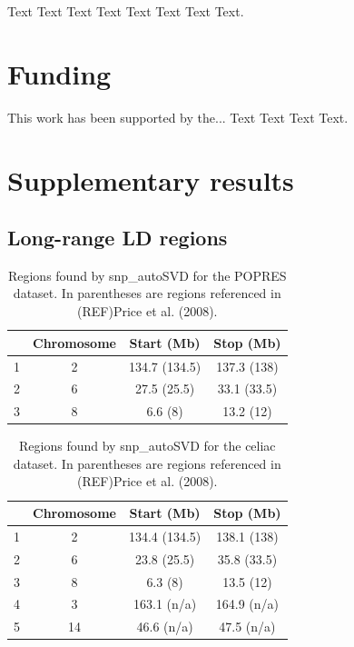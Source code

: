 \documentclass{bioinfo}
\begin{document}
Text Text Text Text Text Text  Text Text. 

\section*{Funding}

This work has been supported by the... Text Text  Text Text.\vspace*{-12pt}




\newpage
\section*{Supplementary results}

\subsection{Long-range LD regions}


\begin{table}[ht]
\centering
\begin{tabular}{lccc}
  \hline
 & Chromosome & Start (Mb) & Stop (Mb) \\ 
  \hline
1 &  2 & 134.7 (134.5) & 137.3 (138) \\ 
  2 &  6 & 27.5 (25.5) & 33.1 (33.5) \\ 
  3 &  8 & 6.6 (8) & 13.2 (12) \\ 
   \hline
\end{tabular}
\caption{Regions found by snp\_autoSVD for the POPRES dataset. In parentheses are regions referenced in (REF)Price et al. (2008).} 
\label{tab:lrldr-popres}
\end{table}

\begin{table}[ht]
\centering
\begin{tabular}{lccc}
  \hline
 & Chromosome & Start (Mb) & Stop (Mb) \\ 
  \hline
1 &  2 & 134.4 (134.5) & 138.1 (138) \\ 
  2 &  6 & 23.8 (25.5) & 35.8 (33.5) \\ 
  3 &  8 & 6.3 (8) & 13.5 (12) \\ 
  4 &  3 & 163.1 (n/a) & 164.9 (n/a) \\ 
  5 & 14 & 46.6 (n/a) & 47.5 (n/a) \\ 
   \hline
\end{tabular}
\caption{Regions found by snp\_autoSVD for the celiac dataset. In parentheses are regions referenced in (REF)Price et al. (2008).} 
\label{tab:lrldr-celiac}
\end{table}
\end{document}
